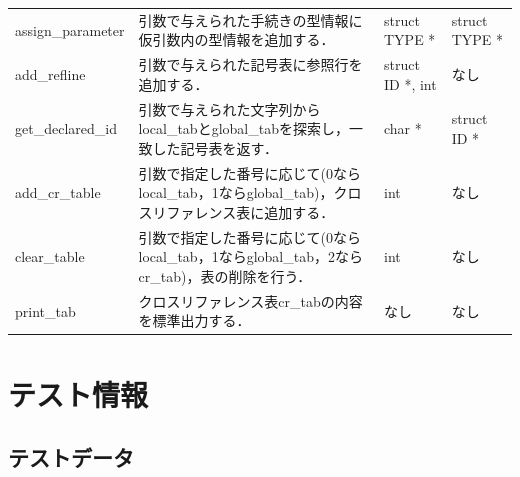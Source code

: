\documentclass{jlreq}
\begin{document}
\begin{table}[H]
{\begin{tabular}{|l|p{6cm}|p{7cm}|p{4cm}|}
      assign\_parameter & 引数で与えられた手続きの型情報に仮引数内の型情報を追加する．                                     & struct TYPE *                          & struct TYPE *                 \\
      add\_refline      & 引数で与えられた記号表に参照行を追加する．                                                       & struct ID *, int                       & なし                          \\
      get\_declared\_id & 引数で与えられた文字列からlocal\_tabとglobal\_tabを探索し，一致した記号表を返す．                & char *                                 & struct ID *                   \\
      add\_cr\_table    & 引数で指定した番号に応じて(0ならlocal\_tab，1ならglobal\_tab)，クロスリファレンス表に追加する．  & int                                    & なし                          \\
      clear\_table      & 引数で指定した番号に応じて(0ならlocal\_tab，1ならglobal\_tab，2ならcr\_tab)，表の削除を行う．    & int                                    & なし                          \\
      print\_tab        & クロスリファレンス表cr\_tabの内容を標準出力する．                                                & なし                                   & なし                          \\ \hline
    \end{tabular}}
  \label{tab:cross_referencer_func}
\end{table}


\section{テスト情報}
\subsection{テストデータ}
\end{document}
